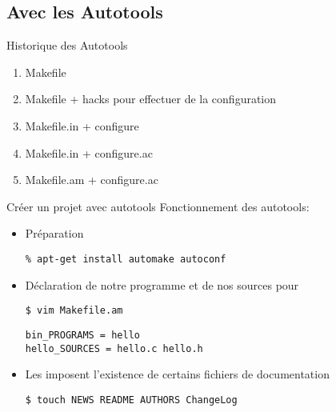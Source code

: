\subsection{Avec les Autotools}

\begin{frame}[fragile=singleslide]{Historique des Autotools}
  \begin{enumerate}
  \item Makefile
  \item Makefile + hacks pour effectuer de la configuration
  \item Makefile.in + configure
  \item Makefile.in + configure.ac
  \item Makefile.am + configure.ac
  \end{enumerate}
\end{frame}

\begin{frame}[fragile=singleslide]{Créer un projet avec autotools}
  Fonctionnement des autotools:
  \begin{itemize}
  \item Préparation 
\begin{lstlisting}
% apt-get install automake autoconf
\end{lstlisting}
  \item Déclaration de notre programme et de nos sources pour 
\begin{lstlisting}
$ vim Makefile.am
\end{lstlisting} %
\begin{lstlisting}
bin_PROGRAMS = hello
hello_SOURCES = hello.c hello.h
\end{lstlisting}
  \item Les   imposent l'existence de certains fichiers
    de documentation
\begin{lstlisting}
$ touch NEWS README AUTHORS ChangeLog
\end{lstlisting} %
  \end{itemize}
\end{frame}

